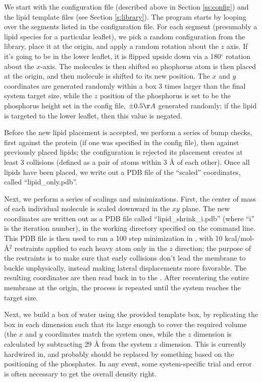 \documentclass[12pt]{article}
\begin{document}
We start with the configuration file (described above in Section
\ref{ss:config}) and the lipid template files (see Section \ref{s:library}).
The program starts by looping over the segments listed in the configuration
file.  For each segment (presumably a lipid species for a particular
leaflet), we pick a random configuration from the library, place it at the
origin, and apply a random rotation about the $z$ axis.  If it's going to be
in the lower leaflet, it is flipped upside down via a 180$^\circ$ rotation
about the $x$-axis.  The molecules is then shifted so phophorus atom is then
placed at the origin, and then molecule is shifted to its new position.  The
$x$ and $y$ coordinates are generated randomly within a box 3 times larger
than the final system target size, while the $z$ position of the phosphorus
is set to be the phosphorus height set in the config file, $\pm 0.5 \AA$
generated randomly; if the lipid is targeted to the lower leaflet, then this
value is negated.

Before the new lipid placement is accepted, we perform a series of bump
checks, first against the protein (if one was specified in the config file),
then against previously placed lipids; the configuration is rejected its
placement creates at least 3 collisions (defined as a pair of atoms within 3
{\AA} of each other).  Once all lipids have been placed, we write out a PDB
file of the ``scaled'' coordinates, called ``lipid\_only.pdb''.

Next, we perform a series of scalings and minimizations.  First, the center
of mass of each individual molecule is scaled downward in the $xy$ plane.
The new coordinates are written out as a PDB file called
``lipid\_shrink\_i.pdb'' (where ``i'' is the iteration number), in the
working directory specified on the command line.  This PDB file is then used
to run a 100 step minimization in \namd, with 10 kcal/mol-{\AA}$^2$
restraints applied to each heavy atom only in the $z$ direction; the purpose
of the restraints is to make sure that early collisions don't lead the
membrane to buckle unphysically, instead making lateral displacements more
favorable.  The resulting coordinates are then read back in to the \omgwtf.
After recentering the entire membrane at the origin, the process is repeated
until the system reaches the target size.

Next, we build a box of water using the provided template box, by replicating
the box in each dimension such that its large enough to cover the required
volume (the $x$ and $y$ coordinates match the system ones, while the $z$
dimension is calculated by subtracting 29 {\AA} from the system $z$
dimension.  This is currently hardwired in, and probably should be replaced
by something based on the positioning of the phosphates.  In any event, some
system-specific trial and error is often necessary to get the overall density
right.
\end{document}
